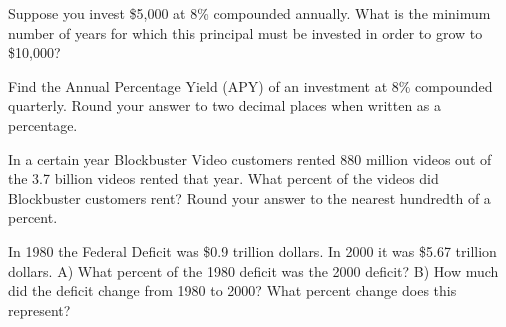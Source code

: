 \documentclass[11pt,epsfig]{article}
\begin{document}
\newpage

\begin{problem}{25}
Suppose you invest \$5,000 at 8\% compounded annually. What is the minimum number of years for which this principal must be invested in order to grow to \$10,000?
\vfill
\end{problem}

\begin{problem}{25}
Find the Annual Percentage Yield (APY) of an investment at 8\% compounded quarterly. Round your answer to two decimal places when written as a percentage.
\vfill
\end{problem}

\newpage

\begin{problem}{25}
In a certain year Blockbuster Video customers rented 880 million videos out of the 3.7 billion videos rented that year. What percent of the videos did Blockbuster customers rent? Round your answer to the nearest hundredth of a percent.
\vfill
\end{problem}

\begin{problem}{25}
In 1980 the Federal Deficit was \$0.9 trillion dollars. In 2000 it was \$5.67 trillion dollars.
\newline
A) What percent of the 1980 deficit was the 2000 deficit?
\newline
B) How much did the deficit change from 1980 to 2000? What percent change does this represent?

\vfill
\end{problem}

\showpoints
\end{document}
